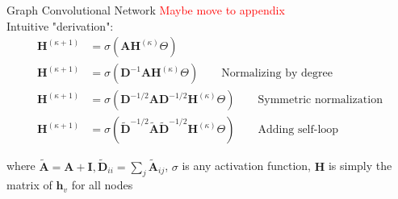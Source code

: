 \documentclass{beamer}
\newcommand{\node}{v}
\newcommand{\nrepresent}{h}
\newcommand{\NodeRepMat}{\mathbf{H}}
\newcommand{\DegMat}{\mathbf{D}}
\newcommand{\iter}{\kappa}
\newcommand{\AdjMat}{\mathbf{A}}
\newcommand{\Identity}{\mathbf{I}}
\begin{document}
\begin{frame}{Graph Convolutional Network}
    \textcolor{red}{Maybe move to appendix} \\ 
Intuitive "derivation": 
\begin{align*}
    \NodeRepMat^{(\iter+1)}
    &=
    \sigma
    \left( 
        \AdjMat \NodeRepMat^{(\iter)} \Theta
    \right) 
\\
    \NodeRepMat^{(\iter+1)}
    &=
    \sigma
    \left( 
        \DegMat^{-1}\AdjMat \NodeRepMat^{(\iter)} \Theta
    \right) 
    \qquad{\text{Normalizing by degree}}
\\
    \NodeRepMat^{(\iter+1)}
    &=
    \sigma
    \left( 
        \DegMat^{-1/2}\AdjMat\DegMat^{-1/2} \NodeRepMat^{(\iter)} \Theta
    \right) 
    \qquad{\text{Symmetric normalization}} %
\\
    \NodeRepMat^{(\iter+1)}
    &=
    \sigma
    \left( 
        \widetilde{\DegMat}^{-1/2}
        \widetilde{\AdjMat}
        \widetilde{\DegMat}^{-1/2} \NodeRepMat^{(\iter)} \Theta
    \right) 
    \qquad{\text{Adding self-loop}}
\end{align*}

where $\widetilde{\AdjMat} = \AdjMat + \Identity, \widetilde{\DegMat}_{ii} = \sum_j \widetilde{\AdjMat}_{ij}$, $\sigma$ is any activation function, $\NodeRepMat$ is simply the matrix of $\mathbf{\nrepresent}_\node$ for all nodes 
\end{frame}
\end{document}
